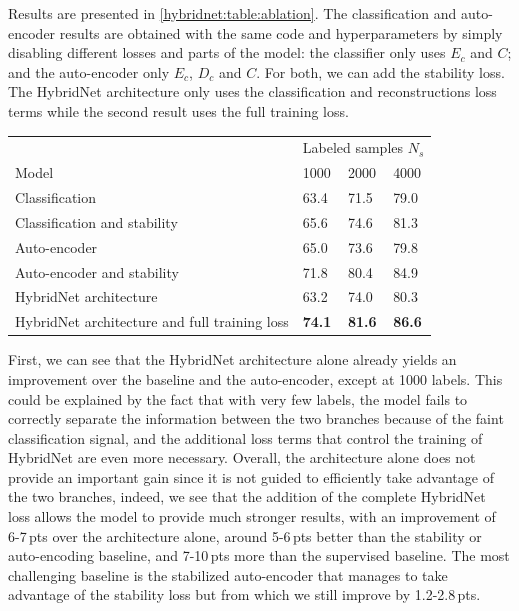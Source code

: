 Results are presented in \autoref{hybridnet:table:ablation}. The classification and auto-encoder results are obtained with the same code and hyperparameters by simply disabling different losses and parts of the model: the classifier only uses $E_c$ and $C$; and the auto-encoder \citep[similar to][]{Zhao2016a} only $E_c$, $D_c$ and $C$. For both, we can add the stability loss. The HybridNet architecture only uses the classification and reconstructions loss terms while the second result uses the full training loss.


\begin{table}[t]
  \centering
  \begin{tabular}{llll}
    \toprule
                                              & \multicolumn{3}{c}{Labeled samples $N_s$}           \\ \cmidrule{2-4}
Model                                         & 1000          & 2000          & 4000          \\ \midrule
Classification                                & 63.4          & 71.5          & 79.0          \\
Classification and stability                  & 65.6          & 74.6          & 81.3          \\ \cmidrule{1-4}
Auto-encoder                                & 65.0          & 73.6          & 79.8          \\
Auto-encoder and stability                  & 71.8          & 80.4          & 84.9          \\ \cmidrule{1-4}

HybridNet architecture                        & 63.2          & 74.0          & 80.3          \\
HybridNet architecture and full training loss & \textbf{74.1} & \textbf{81.6} & \textbf{86.6} \\ \bottomrule
  \end{tabular}

  \label{hybridnet:table:ablation}
\end{table}


First, we can see that the HybridNet architecture alone already yields an improvement over the baseline and the auto-encoder, except at 1000 labels. This could be explained by the fact that with very few labels, the model fails to correctly separate the information between the two branches because of the faint classification signal, and the additional loss terms that control the training of HybridNet are even more necessary. Overall, the architecture alone does not provide an important gain since it is not guided to efficiently take advantage of the two branches, indeed, we see that the addition of the complete HybridNet loss allows the model to provide much stronger results, with an improvement of 6-7\,pts over the architecture alone, around 5-6\,pts better than the stability or auto-encoding baseline, and 7-10\,pts more than the supervised baseline. The most challenging baseline is the stabilized auto-encoder that manages to take advantage of the stability loss but from which we still improve by 1.2-2.8\,pts.

